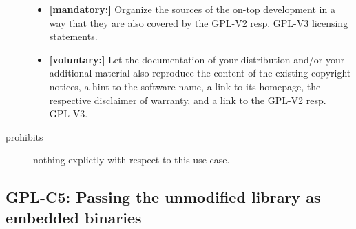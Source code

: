 \begin{description}
\begin{itemize}
 \item \textbf{[mandatory:]} Organize the sources of the on-top development in
  a way that they are also covered by the GPL-V2 resp. GPL-V3 licensing
  statements. 

  \item \textbf{[voluntary:]} Let the documentation of your distribution and/or
  your additional material also reproduce the content of the existing
  copyright notices, a hint to the software name, a link to its homepage,
  the respective disclaimer of warranty, and a link to the GPL-V2 resp.
  GPL-V3.

\end{itemize}

\item[prohibits] nothing explictly with respect to this use case.

\end{description}


\subsection{GPL-C5: Passing the unmodified library as embedded binaries} 
\label{OSUC-07B-GPL} 

